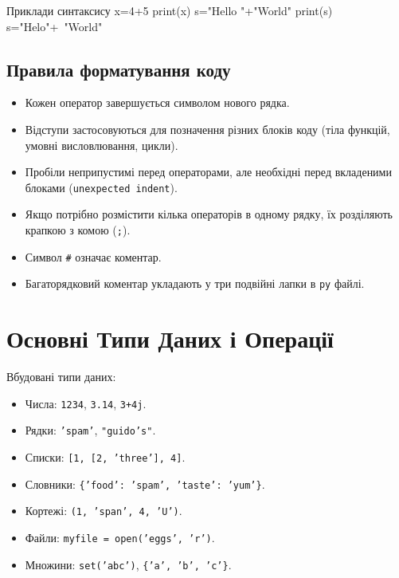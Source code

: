 \begin{py}{Приклади синтаксису}
x=4+5 %
print(x)
s="Hello "+"World"
print(s)
s="Helo"+\
"World" %
\end{py}

\subsection*{Правила форматування коду}
\begin{itemize}
	\item Кожен оператор завершується символом нового рядка.
	\item Відступи застосовуються для позначення різних блоків коду (тіла функцій, умовні висловлювання, цикли).
	\item Пробіли неприпустимі перед операторами, але необхідні перед вкладеними блоками (\texttt{unexpected indent}).
	\item Якщо потрібно розмістити кілька операторів в одному рядку, їх розділяють крапкою з комою (\texttt{;}).
	\item Символ \texttt{\#} означає коментар.
	\item Багаторядковий коментар укладають у три подвійні лапки в \texttt{py} файлі.
\end{itemize}

\section{Основні Типи Даних і Операції}

Вбудовані типи даних:
\begin{itemize}
	\item Числа: \texttt{1234}, \texttt{3.14}, \texttt{3+4j}.
	\item Рядки: \texttt{'spam'}, \texttt{"guido's"}.
	\item Списки: \texttt{[1, [2, 'three'], 4]}.
	\item Словники: \texttt{\{'food': 'spam', 'taste': 'yum'\}}.
	\item Кортежі: \texttt{(1, 'span', 4, 'U')}.
	\item Файли: \texttt{myfile = open('eggs', 'r')}.
	\item Множини: \texttt{set('abc')}, \texttt{\{'a', 'b', 'c'\}}.
	\end{itemize}
	
